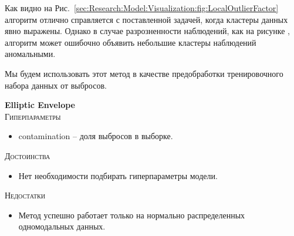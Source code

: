 \documentclass[12pt]{article}
\begin{document}
    \par Как видно на Рис.~\ref{sec:Research:Model:Visualization:fig:LocalOutlierFactor} алгоритм отлично справляется с поставленной задачей, когда кластеры данных явно выражены. Однако в случае разрозненности наблюдений, как на рисунке , алгоритм может ошибочно объявить небольшие кластеры наблюдений аномальными.

    \par Мы будем использовать этот метод в качестве предобработки тренировочного набора данных от выбросов.

    \newpage


    \textbf{Elliptic Envelope} \\

    \noindent \textsc{Гиперпараметры}
    \begin{itemize}
        \item contamination – доля выбросов в выборке.
    \end{itemize}

    \noindent \textsc{Достоинства}
    \begin{itemize}
        \item Нет необходимости подбирать гиперпараметры модели.
    \end{itemize}

    \noindent \textsc{Недостатки}
    \begin{itemize}
        \item Метод успешно работает только на нормально распределенных одномодальных данных.
    \end{itemize}
\end{document}
